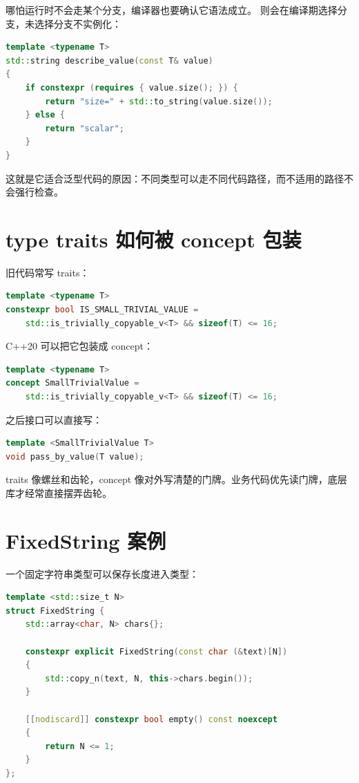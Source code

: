 哪怕运行时不会走某个分支，编译器也要确认它语法成立。 则会在编译期选择分支，未选择分支不实例化：

\begin{lstlisting}[language=C++,caption={if constexpr 按类型选择}]
template <typename T>
std::string describe_value(const T& value)
{
    if constexpr (requires { value.size(); }) {
        return "size=" + std::to_string(value.size());
    } else {
        return "scalar";
    }
}
\end{lstlisting}

这就是它适合泛型代码的原因：不同类型可以走不同代码路径，而不适用的路径不会强行检查。

\section{type traits 如何被 concept 包装}

旧代码常写 traits：

\begin{lstlisting}[language=C++,caption={traits 版本}]
template <typename T>
constexpr bool IS_SMALL_TRIVIAL_VALUE =
    std::is_trivially_copyable_v<T> && sizeof(T) <= 16;
\end{lstlisting}

C++20 可以把它包装成 concept：

\begin{lstlisting}[language=C++,caption={concept 包装类型条件}]
template <typename T>
concept SmallTrivialValue =
    std::is_trivially_copyable_v<T> && sizeof(T) <= 16;
\end{lstlisting}

之后接口可以直接写：

\begin{lstlisting}[language=C++,caption={接口用 concept 表达意图}]
template <SmallTrivialValue T>
void pass_by_value(T value);
\end{lstlisting}

traits 像螺丝和齿轮，concept 像对外写清楚的门牌。业务代码优先读门牌，底层库才经常直接摆弄齿轮。

\section{FixedString 案例}

一个固定字符串类型可以保存长度进入类型：

\begin{lstlisting}[language=C++,caption={固定字符串雏形}]
template <std::size_t N>
struct FixedString {
    std::array<char, N> chars{};

    constexpr explicit FixedString(const char (&text)[N])
    {
        std::copy_n(text, N, this->chars.begin());
    }

    [[nodiscard]] constexpr bool empty() const noexcept
    {
        return N <= 1;
    }
};
\end{lstlisting}

